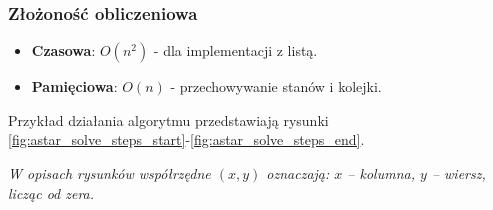\documentclass[../../../../doc.tex]{subfiles}
\begin{document}
\subsubsection{Złożoność obliczeniowa}
\begin{itemize}
  \item \textbf{Czasowa}: $O(n^2)$ - dla implementacji z listą.
  \item \textbf{Pamięciowa}: $O(n)$ - przechowywanie stanów i kolejki.
\end{itemize}
\noindent Przykład działania algorytmu przedstawiają rysunki \ref{fig:astar_solve_steps_start}-\ref{fig:astar_solve_steps_end}.

\vspace{8pt}
\noindent \textit{W opisach rysunków współrzędne \( (x, y) \) oznaczają: \( x \) – kolumna, \( y \) – wiersz, licząc od zera.}

  
\end{document}
